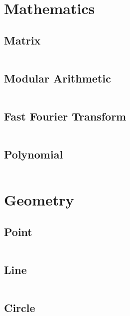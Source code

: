 \documentclass[11pt, a4paper]{amsart}
\begin{document}
	\section{Mathematics}
	\begin{multicols*}{2}
		\subsection{Matrix}
		\inputminted[firstline=18,lastline=67]{c++}{.code/maths/matrix.cpp}
		\vfill\null
		\columnbreak
		\subsection{Modular Arithmetic}
		\inputminted[firstline=15,lastline=40]{c++}{.code/maths/mod.cpp}
		\subsection{Fast Fourier Transform}
		\inputminted[firstline=20,lastline=29]{c++}{.code/maths/polynomial.cpp}
		\vfill\null
	\end{multicols*}
	\newpage
	\begin{multicols*}{2}
		\subsection{Polynomial}
		\inputminted[firstline=33,lastline=87]{c++}{.code/maths/polynomial.cpp}
		\columnbreak
		\vfill\null
	\end{multicols*}
	\newpage
	\section{Geometry}
	\begin{multicols*}{2}
		\subsection{Point}
		\inputminted[firstline=23,lastline=48]{c++}{.code/geometry/point.cpp}
		\subsection{Line}
		\inputminted[firstline=24,lastline=47]{c++}{.code/geometry/line.cpp}
		\vfill\null
		\columnbreak
		\subsection{Circle}
		\inputminted[firstline=25,lastline=69]{c++}{.code/geometry/circ.cpp}
		\vfill\null
	\end{multicols*}
\end{document}
